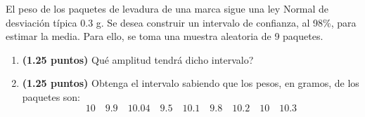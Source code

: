
El peso de los paquetes de levadura de una marca sigue una ley Normal de desviación típica 0.3 g. Se desea construir un intervalo de confianza, al 98\%, para estimar la media. Para ello, se toma una muestra aleatoria de 9 paquetes.
\begin{enumerate}[label=\alph*)]
\item \textbf{(1.25 puntos)} \textquestiondown{}Qué amplitud tendrá dicho intervalo?
\item \textbf{(1.25 puntos)} Obtenga el intervalo sabiendo que los pesos, en gramos, de los paquetes son:
\[
10\quad9.9\quad10.04\quad9.5\quad10.1\quad9.8\quad10.2\quad10\quad10.3
\]
\end{enumerate}
